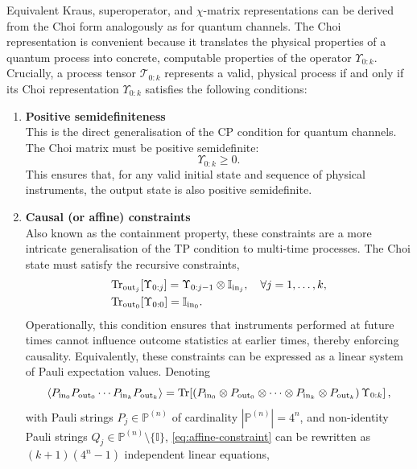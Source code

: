Equivalent Kraus, superoperator, and \(\chi\)-matrix representations can be derived from the Choi form analogously as for quantum channels. The Choi representation is convenient because it translates the physical properties of a quantum process into concrete, computable properties of the operator \(\Upsilon_{0:k}\). Crucially, a process tensor \(\mathcal{T}_{0:k}\) represents a valid, physical process if and only if its Choi representation \(\Upsilon_{0:k}\) satisfies the following conditions:
\begin{enumerate}
    \item \textbf{Positive semidefiniteness} \\
    This is the direct generalisation of the CP condition for quantum channels. The Choi matrix must be positive semidefinite:
    \begin{equation}
        \Upsilon_{0:k} \geq 0.
    \end{equation}
    This ensures that, for any valid initial state and sequence of physical instruments, the output state is also positive semidefinite.
    \item \textbf{Causal (or affine) constraints} \\
    Also known as the containment property, these constraints are a more intricate generalisation of the TP condition to multi-time processes. The Choi state must satisfy the recursive constraints,
    \begin{equation}\label{eq:affine-constraint}
        \begin{split}
            &\mathrm{Tr}_{\mathrm{out}_j}[\Upsilon_{0:j}] = \Upsilon_{0:j-1} \otimes \mathbb{I}_{\mathrm{in}_j}, \quad \forall j=1,\dots,k, \\
            &\mathrm{Tr}_{\mathrm{out}_0}[\Upsilon_{0:0}] = \mathbb{I}_{\mathrm{in}_0}.
        \end{split}
    \end{equation}
    Operationally, this condition ensures that instruments performed at future times cannot influence outcome statistics at earlier times, thereby enforcing causality. Equivalently, these constraints can be expressed as a linear system of Pauli expectation values. Denoting
    \begin{equation*}
        \braket{P_{\mathrm{in}_0}P_{\mathrm{out}_0}\cdots P_{\mathrm{in}_k}P_{\mathrm{out}_k}} = \mathrm{Tr}\!\left[(P_{\mathrm{in}_0}\otimes P_{\mathrm{out}_0} \otimes\cdots\otimes P_{\mathrm{in}_k}\otimes P_{\mathrm{out}_k})\,\Upsilon_{0:k}\right],
    \end{equation*}
with Pauli strings \(P_j \in \mathbb{P}^{(n)}\) of cardinality \(|\mathbb{P}^{(n)}| = 4^n\), and non-identity Pauli strings \(Q_j \in \mathbb{P}^{(n)} \setminus \{\mathbb{I}\}\), \cref{eq:affine-constraint} can be rewritten as \((k+1)(4^n-1)\) independent linear equations,

\end{enumerate}
